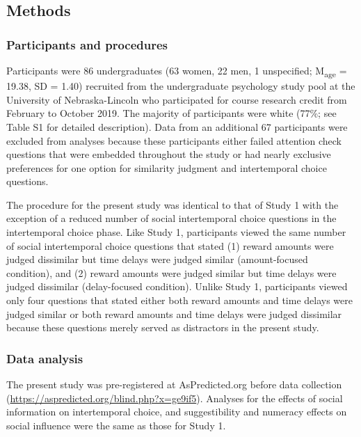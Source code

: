 \documentclass[
  pub,floatsintext]{apa6}
\begin{document}
\hypertarget{methods-1}{%
\subsection{Methods}\label{methods-1}}

\hypertarget{participants-and-procedures-1}{%
\subsubsection{Participants and procedures}\label{participants-and-procedures-1}}

Participants were 86 undergraduates (63 women, 22 men, 1 unspecified; M\textsubscript{age} = 19.38, SD = 1.40) recruited from the undergraduate psychology study pool at the University of Nebraska-Lincoln who participated for course research credit from February to October 2019. The majority of participants were white (77\%; see Table S1 for detailed description). Data from an additional 67 participants were excluded from analyses because these participants either failed attention check questions that were embedded throughout the study or had nearly exclusive preferences for one option for similarity judgment and intertemporal choice questions.

The procedure for the present study was identical to that of Study 1 with the exception of a reduced number of social intertemporal choice questions in the intertemporal choice phase. Like Study 1, participants viewed the same number of social intertemporal choice questions that stated (1) reward amounts were judged dissimilar but time delays were judged similar (amount-focused condition), and (2) reward amounts were judged similar but time delays were judged dissimilar (delay-focused condition). Unlike Study 1, participants viewed only four questions that stated either both reward amounts and time delays were judged similar or both reward amounts and time delays were judged dissimilar because these questions merely served as distractors in the present study.

\hypertarget{data-analysis-1}{%
\subsubsection{Data analysis}\label{data-analysis-1}}

The present study was pre-registered at AsPredicted.org before data collection (\url{https://aspredicted.org/blind.php?x=ge9if5}). Analyses for the effects of social information on intertemporal choice, and suggestibility and numeracy effects on social influence were the same as those for Study 1.
\end{document}
